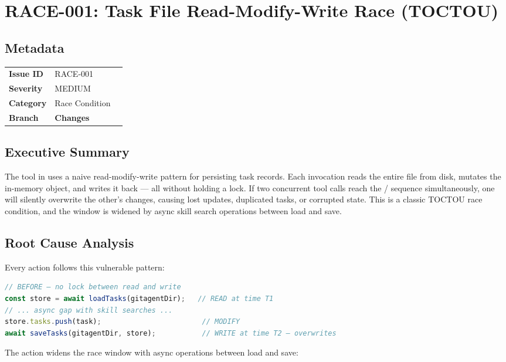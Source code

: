 \section{RACE-001: Task File Read-Modify-Write Race (TOCTOU)}
\label{sec:race-001}
\subsection*{Metadata}
\begin{tabular}{ll}
\textbf{Issue ID} & RACE-001 \\
\textbf{Severity} & MEDIUM \\
\textbf{Category} & Race Condition \\
\textbf{Branch} & 
\textbf{Changes} &  \\
\end{tabular}

\subsection*{Executive Summary}
The  tool in  uses a naive read-modify-write pattern for persisting task records. Each invocation reads the entire  file from disk, mutates the in-memory object, and writes it back — all without holding a lock. If two concurrent tool calls reach the  /  sequence simultaneously, one will silently overwrite the other's changes, causing lost updates, duplicated tasks, or corrupted state. This is a classic TOCTOU race condition, and the window is widened by async skill search operations between load and save.

\subsection*{Root Cause Analysis}
Every action follows this vulnerable pattern:

\begin{lstlisting}[language=TypeScript]
// BEFORE — no lock between read and write
const store = await loadTasks(gitagentDir);   // READ at time T1
// ... async gap with skill searches ...
store.tasks.push(task);                        // MODIFY
await saveTasks(gitagentDir, store);           // WRITE at time T2 — overwrites
\end{lstlisting}

The  action widens the race window with async operations between load and save:


